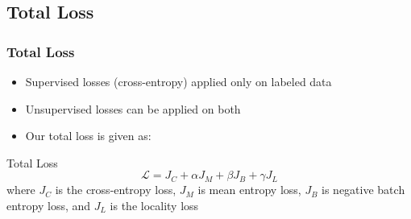 \subsection{Total Loss}
\begin{frame}
	\frametitle{Total Loss}
	\begin{itemize}
		\item Supervised losses (cross-entropy) applied only on labeled data
		\item Unsupervised losses can be applied on both
		\item Our total loss is given as:
	\end{itemize}
	\begin{block}{Total Loss}
		\begin{equation*}
			\mathcal{L} = J_C + \alpha J_M + \beta J_B + \gamma J_L
		\end{equation*}
		where $J_C$ is the cross-entropy loss, $J_M$ is mean entropy loss, $J_B$ is negative batch
		entropy loss, and $J_L$ is the locality loss
	\end{block}
\end{frame}

